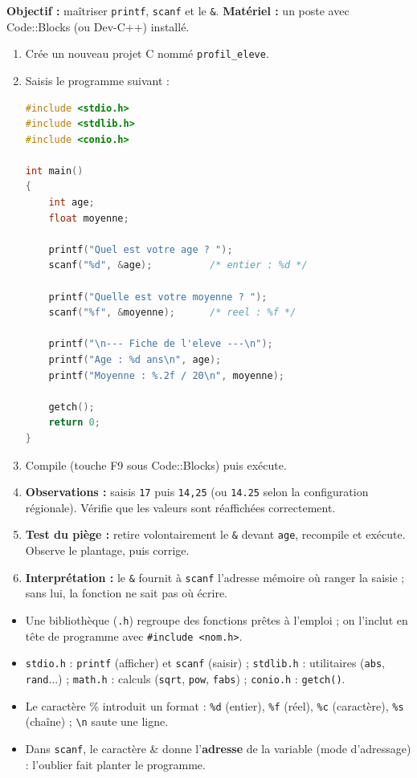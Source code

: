 \documentclass[11pt]{article}
\newcommand{\cle}[1]{{\popxbold\color{popdark}#1}}
\begin{document}
\begin{experience}
\textbf{Objectif :} maîtriser \texttt{printf}, \texttt{scanf} et le \texttt{\&}.
\textbf{Matériel :} un poste avec Code::Blocks (ou Dev-C++) installé.
\begin{enumerate}
\item Crée un nouveau projet C nommé \texttt{profil\_eleve}.
\item Saisis le programme suivant :
\begin{lstlisting}[language=C]
#include <stdio.h>
#include <stdlib.h>
#include <conio.h>

int main()
{
    int age;
    float moyenne;

    printf("Quel est votre age ? ");
    scanf("%d", &age);          /* entier : %d */

    printf("Quelle est votre moyenne ? ");
    scanf("%f", &moyenne);      /* reel : %f */

    printf("\n--- Fiche de l'eleve ---\n");
    printf("Age : %d ans\n", age);
    printf("Moyenne : %.2f / 20\n", moyenne);

    getch();
    return 0;
}
\end{lstlisting}
\item Compile (touche F9 sous Code::Blocks) puis exécute.
\item \textbf{Observations :} saisis \texttt{17} puis \texttt{14,25} (ou \texttt{14.25} selon la configuration régionale). Vérifie que les valeurs sont réaffichées correctement.
\item \textbf{Test du piège :} retire volontairement le \texttt{\&} devant \texttt{age}, recompile et exécute. Observe le plantage, puis corrige.
\item \textbf{Interprétation :} le \texttt{\&} fournit à \texttt{scanf} l'adresse mémoire où ranger la saisie ; sans lui, la fonction ne sait pas où écrire.
\end{enumerate}
\end{experience}

\begin{aretenir}
\begin{itemize}
\item Une \cle{bibliothèque} (\texttt{.h}) regroupe des fonctions prêtes à l'emploi ; on l'inclut en tête de programme avec \texttt{\#include <nom.h>}.
\item \texttt{stdio.h} : \texttt{printf} (afficher) et \texttt{scanf} (saisir) ; \texttt{stdlib.h} : utilitaires (\texttt{abs}, \texttt{rand}...) ; \texttt{math.h} : calculs (\texttt{sqrt}, \texttt{pow}, \texttt{fabs}) ; \texttt{conio.h} : \texttt{getch()}.
\item Le caractère \cle{\%} introduit un format : \texttt{\%d} (entier), \texttt{\%f} (réel), \texttt{\%c} (caractère), \texttt{\%s} (chaîne) ; \texttt{\textbackslash n} saute une ligne.
\item Dans \texttt{scanf}, le caractère \cle{\&} donne l'\textbf{adresse} de la variable (mode d'adressage) : l'oublier fait planter le programme.
\end{itemize}
\end{aretenir}
\end{document}

